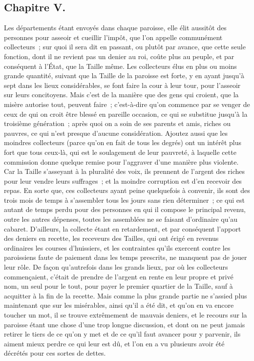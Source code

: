 \documentclass[french,twoside]{book} %
\begin{document}
\subsection[{Chapitre V.}]{Chapitre V.}
\noindent Les départements étant envoyés dans chaque paroisse, elle élit aussitôt des personnes pour asseoir et cueillir l’impôt, que l’on appelle communément collecteurs ; sur quoi il sera dit en passant, ou plutôt par avance, que cette seule fonction, dont il ne revient pas un denier au roi, coûte plus au peuple, et par conséquent à l’État, que la Taille même. Les collecteurs élus en plus ou moins grande quantité, suivant que la Taille de la paroisse est forte, y en ayant jusqu’à sept dans les lieux considérables, se font faire la cour à leur tour, pour l’asseoir sur leurs concitoyens. Mais c’est de la manière que des gens qui croient, que la misère autorise tout, peuvent faire ; c’est-à-dire qu’on commence par se venger de ceux de qui on croit être blessé en pareille occasion, ce qui se substitue jusqu’à la troisième génération ; après quoi on a soin de ses parents et amis, riches ou pauvres, ce qui n’est presque d’aucune considération. Ajoutez aussi que les moindres collecteurs (parce qu’on en fait de tous les degrés) ont un intérêt plus fort que tous ceux-là, qui est le soulagement de leur pauvreté, à laquelle cette commission donne quelque remise pour l’aggraver d’une manière plus violente. Car la Taille s’asseyant à la pluralité des voix, ils prennent de l’argent des riches pour leur vendre leurs suffrages ; et la moindre corruption est d’en recevoir des repas. En sorte que, ces collecteurs ayant peine quelquefois à convenir, ils sont des trois mois de temps à s’assembler tous les jours sans rien déterminer ; ce qui est autant de temps perdu pour des personnes en qui il compose le principal revenu, outre les autres dépenses, toutes les assemblées ne se faisant d’ordinaire qu’au cabaret. D’ailleurs, la collecte étant en retardement, et par conséquent l’apport des deniers en recette, les receveurs des Tailles, qui ont érigé en revenus ordinaires les courses d’huissiers, et les contraintes qu’ils exercent contre les paroissiens faute de paiement dans les temps prescrits, ne manquent pas de jouer leur rôle. De façon qu’autrefois dans les grands lieux, par où les collecteurs commençaient, c’était de prendre de l’argent en rente en leur propre et privé nom, un seul pour le tout, pour payer le premier quartier de la Taille, sauf à acquitter à la fin de la recette. Mais comme la plus grande partie ne s’assied plus maintenant que sur les misérables, ainsi qu’il a été dit, et qu’on en va encore toucher un mot, il se trouve extrêmement de mauvais deniers, et le recours sur la paroisse étant une chose d’une trop longue discussion, et dont on ne peut jamais retirer le tiers de ce qu’on y met et de ce qu’il faut avancer pour y parvenir, ils aiment mieux perdre ce qui leur est dû, et l’on en a vu plusieurs avoir été décrétés pour ces sortes de dettes.\par
\end{document}

